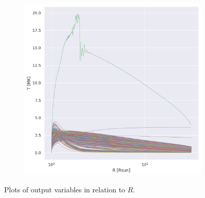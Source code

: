 \begin{figure}[ht]
\begin{subfigure}[b]{0.32\textwidth}
     \end{subfigure}
     \hfill
    \begin{subfigure}[b]{0.32\textwidth}
         \centering
         \includegraphics[width=\textwidth]{figures/temperature_radius.png}
     \end{subfigure}
     \hfill
    \caption{Plots of output variables in relation to $R$.}
    \label{fig:output_distr_plot}
\end{figure}

